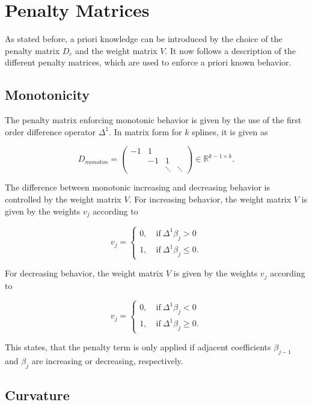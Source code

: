 \documentclass[10pt,a4paper]{article}
\begin{document}
						
	\section{Penalty Matrices}
	
	
	As stated before, a priori knowledge can be introduced by the choice of the penalty matrix $D_c$ and the weight matrix $V$. It now follows a description of the different penalty matrices, which are used to enforce a priori known behavior. 
	
	
	\subsection{Monotonicity}
	
	The penalty matrix enforcing monotonic behavior is given by the use of the first order difference operator $\Delta^1$. In matrix form for $k$ splines, it is given as
	
	$$D_{monoton} = \begin{pmatrix} -1 & 1  \\ 
									& -1 & 1 \\ 
									& & \ddots & \ddots  
				    \end{pmatrix} \in \mathbb{R}^{k-1 \times k}.$$
	
	The difference between monotonic increasing and decreasing behavior is controlled by the weight matrix $V$. For increasing behavior, the weight matrix $V$ is given by the weights $v_j$ according to
	
	$$v_j = \begin{cases} 0, \quad \text{if} \ \Delta^1\beta_j > 0 \\ 
					      1, \quad \text{if} \ \Delta^1\beta_j \le 0.
			\end{cases}$$
	
	For decreasing behavior, the weight matrix $V$ is given by the weights $v_j$ according to
	
	$$v_j = \begin{cases} 0, \quad \text{if} \ \Delta^1\beta_j < 0 \\ 
						  1, \quad \text{if} \ \Delta^1\beta_j \ge 0.
			\end{cases}$$
	
	This states, that the penalty term is only applied if adjacent coefficients $\beta_{j-1}$ and $\beta_j$ are increasing or decreasing, respectively. 
	
	\subsection{Curvature}
	
\end{document}
